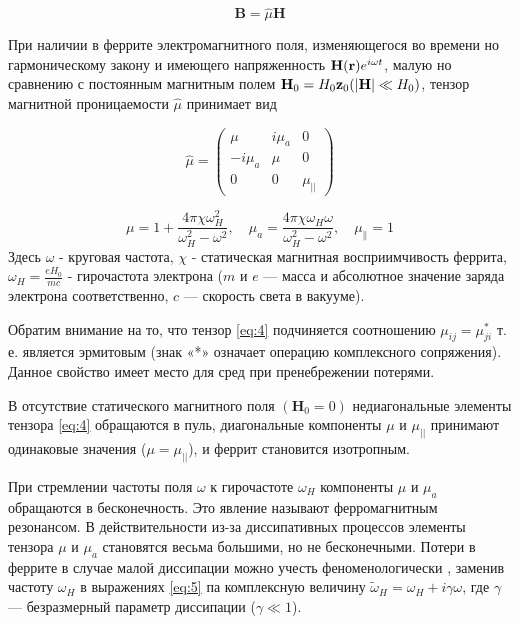 \begin{equation}
    \textbf{B} = \hat{\mu}\textbf{H}
    \label{eq:3}
\end{equation}

При наличии в феррите электромагнитного поля, изменяющегося во времени но гармоническому закону и имеющего напряженность
$\textbf{H}(\textbf{r})e^{i\omega t}$, малую но сравнению с постоянным магнитным полем $\textbf{H}_0 =
H_0\textbf{z}_0(|\textbf{H}|\ll H_0)$, тензор магнитной проницаемости $\hat{\mu}$ принимает вид

\begin{equation}
    \hat{\mu}=\left(\begin{array}
        {ccc}{\mu} & {i\mu_{a}} & {0} \\
        {-i\mu_{a}} & {\mu} & {0} \\
        {0} & {0} & {\mu_{||}}
    \end{array}\right)
    \label{eq:4}
\end{equation}

\begin{equation}
    \mu=1+\frac{4 \pi \chi \omega_{H}^{2}}{\omega_{H}^{2}-\omega^{2}}, 
    \quad \mu_{a}=\frac{4 \pi \chi \omega_{H} \omega}{\omega_{H}^{2}-\omega^{2}}, 
    \quad \mu_{ \|}=1
    \label{eq:5}
\end{equation}
Здесь $\omega$ - круговая частота, $\chi$ - статическая магнитная восприимчивость феррита, $\omega_H = \frac{e H_0}{m
c}$ - гирочастота электрона ($m$ и $e$ — масса и абсолютное значение заряда электрона соответственно, $c$ — скорость света в вакууме).


Обратим внимание на то, что тензор \eqref{eq:4} подчиняется соотношению $\mu_{ij} = \mu_{ji}^*$ т. е. является эрмитовым (знак «*» означает
операцию комплексного сопряжения). Данное свойство имеет место для сред при пренебрежении потерями.

В отсутствие статического магнитного поля $(\textbf{H}_0 = 0)$ недиагональные элементы тензора \eqref{eq:4} обращаются в пуль, диагональные
компоненты $\mu$ и $\mu_{||}$ принимают одинаковые значения ($\mu=\mu_{||}$), и феррит становится изотропным.

При стремлении частоты поля $\omega$ к гирочастоте $\omega_H$ компоненты $\mu$ и $\mu_a$ обращаются в бесконечность. Это явление называют
ферромагнитным резонансом. В действительности из-за диссипативных процессов элементы тензора $\mu$ и $\mu_a$ становятся весьма
большими, но не бесконечными. Потери в феррите в случае малой диссипации можно учесть феноменологически , заменив
частоту $\omega_H$ в выражениях \eqref{eq:5} па комплексную величину $\tilde{\omega}_H = \omega_H+ i \gamma \omega$, где
$\gamma$ — безразмерный параметр диссипации ($\gamma \ll 1$).

